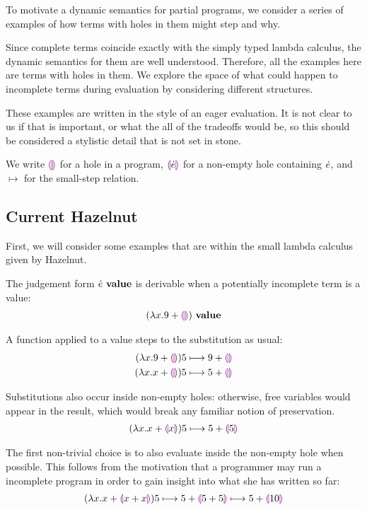To motivate a dynamic semantics for partial programs, we consider a series
of examples of how terms with holes in them might step and why.

Since complete terms coincide exactly with the simply typed lambda
calculus, the dynamic semantics for them are well understood. Therefore,
all the examples here are terms with holes in them. We explore the space of
what could happen to incomplete terms during evaluation by considering
different structures.

These examples are written in the style of an eager evaluation. It is not
clear to us if that is important, or what the all of the tradeoffs would
be, so this should be considered a stylistic detail that is not set in
stone.

We write $\textcolor{violet}{\llparenthesis}\textcolor{violet}{\rrparenthesis}$ for a hole in a program, $\textcolor{violet}{\llparenthesis}\dot{e}\textcolor{violet}{\rrparenthesis}$ for a non-empty
hole containing $\dot{e}$, and $\mapsto$ for the small-step relation.

\subsection{Current Hazelnut}
First, we will consider some examples that are within the small lambda
calculus given by Hazelnut.

The judgement form ${\dot{e}} ~\mathbf{value}$ is derivable when a potentially
incomplete term is a value:
\begin{align*}
  {(\lambda x. 9 + \textcolor{violet}{\llparenthesis}\textcolor{violet}{\rrparenthesis})} ~\mathbf{value}
\end{align*}

A function applied to a value steps to the substitution as usual:
\begin{align*}
  {
        (\lambda x.9 + \textcolor{violet}{\llparenthesis}\textcolor{violet}{\rrparenthesis})5
      } \longmapsto {
        9 + \textcolor{violet}{\llparenthesis}\textcolor{violet}{\rrparenthesis}}
      \\
      {
        (\lambda x.x + \textcolor{violet}{\llparenthesis}\textcolor{violet}{\rrparenthesis})5
      } \longmapsto {
        5 + \textcolor{violet}{\llparenthesis}\textcolor{violet}{\rrparenthesis}}
\end{align*}

Substitutions also occur inside non-empty holes: otherwise, free variables
would appear in the result, which would break any familiar notion of
preservation.
\begin{align*}
  {
        (\lambda x.x + \textcolor{violet}{\llparenthesis}x\textcolor{violet}{\rrparenthesis})5
      } \longmapsto {
        5 + \textcolor{violet}{\llparenthesis}5\textcolor{violet}{\rrparenthesis}}
\end{align*}

The first non-trivial choice is to also evaluate inside the non-empty hole
when possible.
%
%
This follows from the motivation that a programmer may run a incomplete
program in order to gain insight into what she has written so far:
\begin{align*}
  {
    {
          (\lambda x.x + \textcolor{violet}{\llparenthesis}x + x\textcolor{violet}{\rrparenthesis})5
        } \longmapsto {
          5 + \textcolor{violet}{\llparenthesis}5 + 5\textcolor{violet}{\rrparenthesis}}
  } \longmapsto {5 + \textcolor{violet}{\llparenthesis}10\textcolor{violet}{\rrparenthesis}}
\end{align*}

